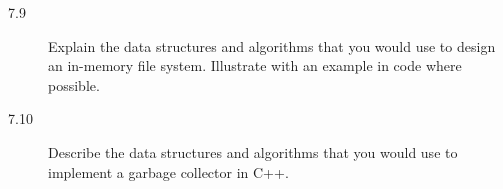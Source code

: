 \begin{description}
\item[7.9] Explain the data structures and algorithms that you would use to design an in-memory file system. Illustrate with an example in code where possible.
%

\item[7.10] Describe the data structures and algorithms that you would use to implement a garbage collector in C++.
%

\end{description}
